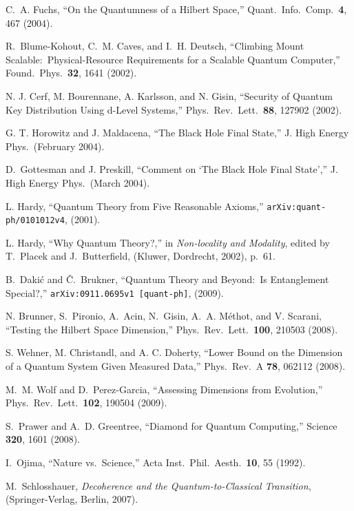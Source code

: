 \begin{thebibliography}{100}
C.~A. Fuchs, ``On the Quantumness of a Hilbert Space,'' Quant.\ Info.\ Comp.\ {\bf 4}, 467 (2004).

R.~Blume-Kohout, C.~M. Caves, and I.~H. Deutsch, ``Climbing Mount Scalable:\ Physical-Resource Requirements for a Scalable Quantum Computer,'' Found.\ Phys.\ {\bf 32}, 1641 (2002).

N. J. Cerf, M. Bourennane, A. Karlsson, and N. Gisin,   ``Security of Quantum Key Distribution Using d-Level Systems,'' Phys.\ Rev.\ Lett.\ {\bf 88}, 127902 (2002).

G. T. Horowitz and J. Maldacena, ``The Black Hole Final State,'' J. High Energy Phys.\ (February 2004).

D.~Gottesman and J. Preskill, ``Comment on `The Black Hole Final State','' J. High Energy Phys.\ (March 2004).

L. Hardy, ``Quantum Theory from Five Reasonable Axioms,'' {\tt arXiv:quant-ph/0101012v4}, (2001).

L. Hardy, ``Why Quantum Theory?,'' in {\sl Non-locality and Modality}, edited by T.~Placek and J.~Butterfield, (Kluwer, Dordrecht, 2002), p.~61.

B.~Daki\'c and \v{C}.~Brukner, ``Quantum Theory and Beyond:\ Is Entanglement Special?,'' {\tt arXiv:0911.0695v1 [quant-ph]}, (2009).

N. Brunner, S.~Pironio, A.~Acin, N.~Gisin, A.~A. M\'ethot, and V. Scarani, ``Testing the Hilbert Space Dimension,'' Phys.\ Rev.\ Lett.\ {\bf 100}, 210503 (2008).

S. Wehner, M. Christandl, and A. C. Doherty, ``Lower Bound on the Dimension of a Quantum System Given Measured Data,'' Phys.\ Rev.\ A {\bf 78}, 062112 (2008).

M.~M. Wolf and D.~Perez-Garcia, ``Assessing Dimensions from Evolution,'' Phys.\ Rev.\ Lett.\ {\bf 102}, 190504 (2009).

S.~Prawer and A.~D. Greentree, ``Diamond for Quantum Computing,'' Science {\bf 320}, 1601 (2008).

I.~Ojima, ``Nature vs.\ Science,'' Acta Inst.\ Phil.\ Aesth.\ {\bf 10}, 55 (1992).

M.~Schlosshauer, {\sl Decoherence and the Quantum-to-Classical Transition}, (Springer-Verlag, Berlin, 2007).


\end{thebibliography}
